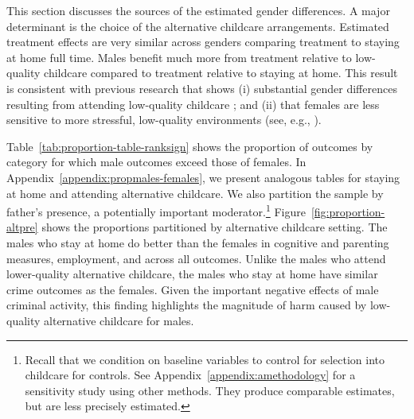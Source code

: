 This section discusses the sources of the estimated gender differences. A major determinant is the choice of the alternative childcare arrangements. Estimated treatment effects are very similar across genders comparing treatment to staying at home full time. Males benefit much more from treatment relative to low-quality childcare compared to treatment relative to staying at home. This result is consistent with previous research that shows (i) substantial gender differences resulting from attending low-quality childcare \citep{Kottelenberg-Lehrer_2014_Gender-Effects,Baker_Gruber_Milligan_2015_Noncog_Defects}; and (ii) that females are less sensitive to more stressful, low-quality environments (see, e.g., \citealp{golding2016psychology,Autor-etal_2015_Family-Disadvantage}).

Table~\ref{tab:proportion-table-ranksign} shows the proportion of outcomes by category for which male outcomes exceed those of females. In Appendix~\ref{appendix:propmales-females}, we present analogous tables for staying at home and attending alternative childcare. We also partition the sample by father's presence, a potentially important moderator.\footnote{Recall that we condition on baseline variables to control for selection into childcare for controls. See Appendix~\ref{appendix:amethodology} for a sensitivity study using other methods. They produce comparable estimates, but are less precisely estimated.} Figure~\ref{fig:proportion-altpre} shows the proportions partitioned by alternative childcare setting. The males who stay at home do better than the females in cognitive and parenting measures, employment, and across all outcomes. Unlike the males who attend lower-quality alternative childcare, the males who stay at home have similar crime outcomes as the females. Given the important negative effects of male criminal activity, this finding highlights the magnitude of harm caused by low-quality alternative childcare for males.


